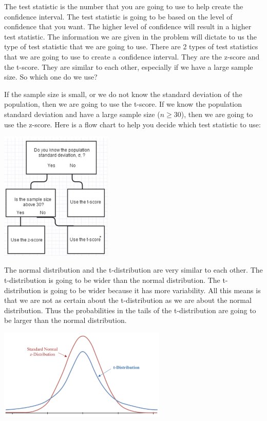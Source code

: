 \documentclass[
  letterpaper,
  DIV=11,
  numbers=noendperiod]{scrreprt}
\begin{document}
The test statistic is the number that you are going to use to help
create the confidence interval. The test statistic is going to be based
on the level of confidence that you want. The higher level of confidence
will result in a higher test statistic. The information we are given in
the problem will dictate to us the type of test statistic that we are
going to use. There are 2 types of test statistics that we are going to
use to create a confidence interval. They are the z-score and the
t-score. They are similar to each other, especially if we have a large
sample size. So which one do we use?

If the sample size is small, or we do not know the standard deviation of
the population, then we are going to use the t-score. If we know the
population standard deviation and have a large sample size
(\(n \geq 30\)), then we are going to use the z-score. Here is a flow
chart to help you decide which test statistic to use:

\includegraphics[width=0.4\textwidth,height=\textheight]{./images/EPCI_7.jpg}

The normal distribution and the t-distribution are very similar to each
other. The t-distribution is going to be wider than the normal
distribution. The t-distribution is going to be wider because it has
more variability. All this means is that we are not as certain about the
t-distribution as we are about the normal distribution. Thus the
probabilities in the tails of the t-distribution are going to be larger
than the normal distribution.

\includegraphics[width=0.6\textwidth,height=\textheight]{./images/EPCI_8.jpg}
\end{document}
